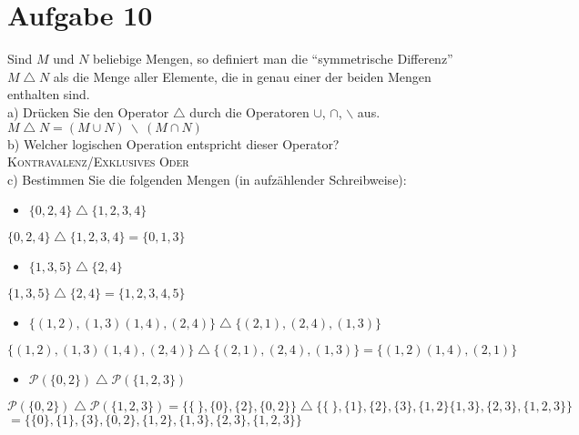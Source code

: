 \section*{Aufgabe 10}

Sind $M$ und $N$ beliebige Mengen, so definiert man die ``symmetrische Differenz'' $M \bigtriangleup N$ als die Menge aller Elemente, die in genau einer der beiden Mengen enthalten sind.\\

a) Drücken Sie den Operator $\bigtriangleup$ durch die Operatoren $\cup$, $\cap$, $\backslash$ aus.\\

$M \bigtriangleup N = (M \cup N) \ \backslash \ (M \cap N)$\\

b) Welcher logischen Operation entspricht dieser Operator?\\

\textsc{Kontravalenz/Exklusives Oder}\\

c) Bestimmen Sie die folgenden Mengen (in aufzählender Schreibweise):

\begin{itemize}
\item $\{0, 2, 4\} \bigtriangleup \{1, 2, 3, 4\}$
\end{itemize}

$\{0, 2, 4\} \bigtriangleup \{1, 2, 3, 4\} = \{ 0, 1, 3 \}$

\begin{itemize}
\item $\{1, 3, 5\} \bigtriangleup \{2, 4\}$
\end{itemize}

$\{1, 3, 5\} \bigtriangleup \{2, 4\} = \{ 1, 2, 3, 4, 5 \}$

\begin{itemize}
\item $\{ (1,2), (1,3) (1,4), (2,4) \} \bigtriangleup \{ (2,1), (2,4), (1,3) \}$
\end{itemize}

$\{ (1,2), (1,3) (1,4), (2,4) \} \bigtriangleup \{ (2,1), (2,4), (1,3) \} = \{ (1,2) (1,4), (2,1) \} $

\begin{itemize}
\item $\mathcal{P}( \{0,2\} ) \bigtriangleup \mathcal{P}( \{1, 2, 3\} )$
\end{itemize}

$\mathcal{P}( \{0,2\} ) \bigtriangleup \mathcal{P}( \{1, 2, 3\} ) = \{ \{ \ \}, \{0\}, \{2\}, \{0, 2\}\} \bigtriangleup \{ \{ \ \}, \{1\}, \{2\}, \{3\}, \{1, 2\} \{1, 3\}, \{2, 3\}, \{1, 2, 3\} \}$\\
\hspace*{10.26em}$= \{ \{0\}, \{1\}, \{3\}, \{0,2\}, \{1,2\}, \{1,3\}, \{2,3\}, \{1,2,3\} \}$

\newpage
